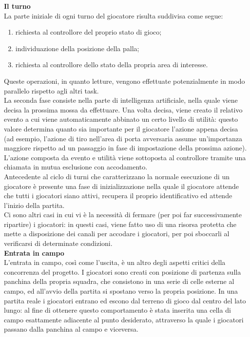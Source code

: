 \textbf{Il turno}\\

La parte iniziale di ogni turno del giocatore risulta suddivisa come segue:

\begin{enumerate}
	\item richiesta al controllore del proprio stato di gioco;
	\item individuazione della posizione della palla;
	\item richiesta al controllore dello stato della propria area di interesse.
\end{enumerate}

Queste operazioni, in quanto letture, vengono effettuate potenzialmente in modo parallelo rispetto agli altri task.\\

La seconda fase consiste nella parte di intelligenza artificiale, nella quale viene decisa la prossima mossa da effettuare. Una volta decisa, viene creato il relativo evento a cui viene automaticamente abbinato un certo livello di utilità: questo valore determina quanto sia importante per il giocatore l'azione appena decisa (ad esempio, l'azione di tiro nell'area di porta avversaria assume un'importanza maggiore rispetto ad un passaggio in fase di impostazione della prossima azione). L'azione composta da evento e utilità viene sottoposta al controllore tramite una chiamata in mutua esclusione con accodamento.\\

Antecedente al ciclo di turni che caratterizzano la normale esecuzione di un giocatore è presente una fase di inizializzazione nella quale il giocatore attende che tutti i giocatori siano attivi, recupera il proprio identificativo ed attende l'inizio della partita.\\

Ci sono altri casi in cui vi è la necessità di fermare (per poi far successivamente ripartire) i giocatori: in questi casi, viene fatto uso di una risorsa protetta che mette a disposizione dei canali per accodare i giocatori, per poi sboccarli al verificarsi di determinate condizioni.\\

\textbf{Entrata in campo}\\

L'entrata in campo, così come l'uscita, è un altro degli aspetti critici della concorrenza del progetto. I giocatori sono creati con posizione di partenza sulla panchina della propria squadra, che consistono in una serie di celle esterne al campo, ed all'avvio della partita si spostano verso la propria posizione. In una partita reale i giocatori entrano ed escono dal terreno di gioco dal centro del lato lungo: al fine di ottenere questo comportamento è stata inserita una cella di campo esattamente adiacente al punto desiderato, attraverso la quale i giocatori passano dalla panchina al campo e viceversa.\\

